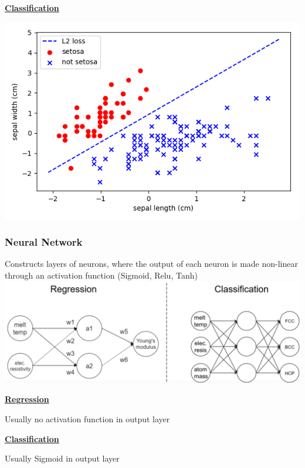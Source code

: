         {\centering \underline{\textbf{Classification}} \par}
        {\centering \includegraphics[width = 0.8\linewidth]{src/8_ml/images/linear_classifier.png} \par}

    \subsubsection{Neural Network}
        Constructs layers of neurons, where the output of each neuron is made non-linear through an activation function (Sigmoid, Relu, Tanh)\\
        \includegraphics[width = \linewidth]{src/8_ml/images/neural_network_regression_vs_classifier.png}
        
        {\centering \underline{\textbf{Regression}} \par}
        Usually no activation function in output layer\\
        
        
        {\centering \underline{\textbf{Classification}} \par}
        Usually Sigmoid in output layer\\
        
        
